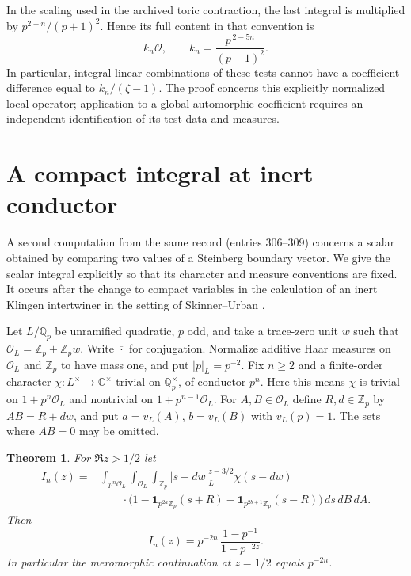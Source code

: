 \documentclass[11pt]{article}
\newtheorem{theorem}{Theorem}
\newcommand{\Zp}{\mathbb Z_p}
\newcommand{\Qp}{\mathbb Q_p}
\newcommand{\OO}{\mathcal O}
\begin{document}
In the scaling used in the archived toric contraction, the last
integral is multiplied by $p^{2-n}/(p+1)^2$. Hence its full
content in that convention is
\[
 k_n\OO,\qquad k_n=\frac{p^{\,2-5n}}{(p+1)^2}.
\]
In particular, integral linear combinations of these tests cannot
have a coefficient difference equal to $k_n/(\zeta-1)$.
The proof concerns this explicitly normalized local operator;
application to a global automorphic coefficient requires an
independent identification of its test data and measures.

\section{A compact integral at inert conductor}
\label{sec:integral}

A second computation from the same record (entries 306--309)
concerns a scalar obtained by comparing two values of a Steinberg
boundary vector. We give the scalar integral explicitly so that its
character and measure conventions are fixed. It occurs after the
change to compact variables in the calculation of an inert Klingen
intertwiner in the setting of Skinner--Urban \cite{SU}.

Let $L/\Qp$ be unramified quadratic, $p$ odd, and take a trace-zero
unit $w$ such that $\OO_L=\Zp+\Zp w$. Write $\overline{\cdot}$ for
conjugation. Normalize additive Haar measures on $\OO_L$ and $\Zp$
to have mass one, and put $|p|_L=p^{-2}$. Fix $n\ge2$ and a
finite-order character $\chi:L^\times\to\mathbb C^\times$ trivial
on $\Qp^\times$, of conductor $p^n$. Here this means $\chi$ is
trivial on $1+p^n\OO_L$ and nontrivial on $1+p^{n-1}\OO_L$.
For $A,B\in\OO_L$ define $R,d\in\Zp$ by
$A\bar B=R+dw$, and put $a=v_L(A)$, $b=v_L(B)$ with
$v_L(p)=1$. The sets where $AB=0$ may be omitted.

\begin{theorem}
For $\Re z>1/2$ let
\begin{align*}
 I_n(z)={}&
 \int_{p^n\OO_L}\int_{\OO_L}\int_{\Zp}
       |s-dw|_L^{z-3/2}\chi(s-dw)\\[-1mm]
 &\qquad {}\cdot
 \bigl(1-\mathbf1_{p^{2a}\Zp}(s+R)
          -\mathbf1_{p^{2b+1}\Zp}(s-R)\bigr)\,ds\,dB\,dA.
\end{align*}
Then
\[
 I_n(z)=p^{-2n}\,\frac{1-p^{-1}}{1-p^{-2z}} .
\]
In particular the meromorphic continuation at $z=1/2$ equals $p^{-2n}$.
\end{theorem}
\end{document}
